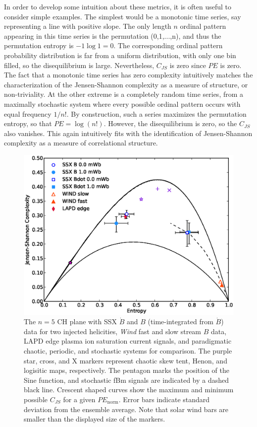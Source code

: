 \documentclass[aps,prx,twocolumn,secnumarabic,nobalancelastpage,amsmath,amssymb,
nofootinbib]{revtex4-1}
\begin{document}
In order to develop some intuition about these metrics, it is often useful to consider simple examples. The simplest would be a monotonic time series, say representing a line with positive slope. The only length $n$ ordinal pattern appearing in this time series is the permutation (0,1,...,n), and thus the permutation entropy is $-1 \log 1 =0$. The corresponding ordinal pattern probability distribution is far from a uniform distribution, with only one bin filled, so the disequilibrium is large. Nevertheless, $C_{JS}$ is zero since $PE$ is zero. The fact that a monotonic time series has zero complexity intuitively matches the characterization of the Jensen-Shannon complexity as a measure of structure, or non-triviality. At the other extreme is a completely random time series, from a maximally stochastic system where every possible ordinal pattern occurs with equal frequency $1/n!$. By construction, such a series maximizes the permutation entropy, so that $PE=\log (n!)$. However, the disequilibrium is zero, so the $C_{JS}$ also vanishes. This again intuitively fits with the identification of Jensen-Shannon complexity as a measure of correlational structure.
%
\begin{figure}[!htb]
\centerline{
\includegraphics[width=15cm]{figure1.eps}}
\caption{\label{fig:CHplane} The $n=5$ CH plane  with SSX $\dot{B}$ and $B$ (time-integrated from $\dot{B}$) data for two injected helicities, \textit{Wind} fast and slow stream $B$ data, LAPD edge plasma ion saturation current signals, and paradigmatic chaotic, periodic, and stochastic systems for comparison. The purple star, cross, and X markers represent chaotic skew tent, Henon, and logisitic maps, respectively. The pentagon marks the position of the Sine function, and stochastic fBm signals are indicated by a dashed black line. Crescent shaped curves show the maximum and minimum possible $C_{JS}$ for a given $PE_{\text{norm}}$. Error bars indicate standard deviation from the ensemble average. Note that solar wind bars are smaller than the displayed size of the markers.}
\end{figure}
%
\end{document}
